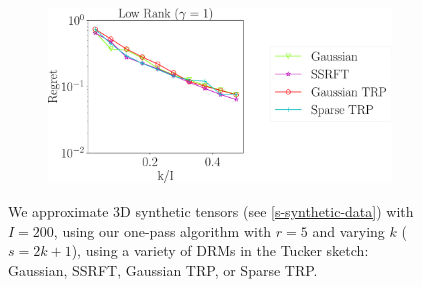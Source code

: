 \begin{figure}
	\begin{subfigure}{0.55\textwidth}
		\includegraphics[scale = 0.25]{figure/fig2_lk_hnoise_200.pdf}
	\end{subfigure}
	\caption{We approximate 3D synthetic tensors (see \ref{s-synthetic-data}) with $I = 200$,
		using our one-pass algorithm with $r = 5$ and varying $k$ ($s = 2k+1$),
		using a variety of DRMs in the Tucker sketch:
		Gaussian, SSRFT, Gaussian TRP, or Sparse TRP.}
		\label{fig:vary-k-200-app}
\end{figure}



